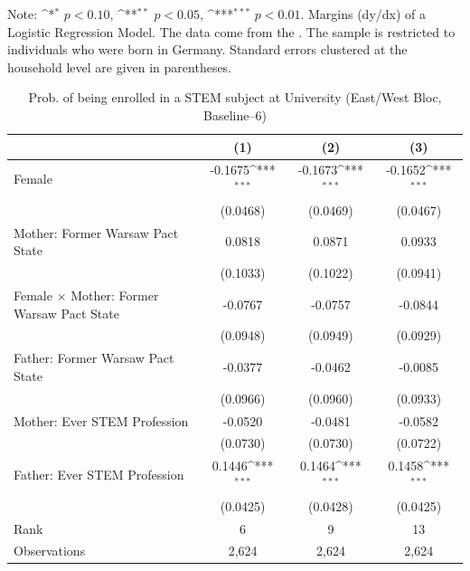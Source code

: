 \documentclass[a4paper, oneside, hyperfootnotes = false]{article}
\def\sym#1{\ifmmode^{#1}\else\(^{#1}\)\fi}
\begin{document}
{\begin{table}[ht]
\begin{center}
		\parbox{10cm}{
			\linespread{1}\footnotesize Note: \sym{*} \(p<0.10\), \sym{**} \(p<0.05\), \sym{***} \(p<0.01\). Margins (dy/dx) of a Logistic Regression Model. The data come from the \cite{SOEP2023}. The sample is restricted to individuals who were born in Germany. Standard errors clustered at the household level are given in parentheses.}
		
	\end{center}
\end{table}

\begin{table}[ht]
	\caption[STEM subject at University (East/West Bloc, Baseline--6)]{Prob. of being enrolled in a STEM subject at University (East/West Bloc, Baseline--6)}
	\label{tab:extension}
	\begin{center}
		\begin{tabular}{l*{3}{c}}
			\toprule
			&\multicolumn{1}{c}{(1)}         &\multicolumn{1}{c}{(2)}         &\multicolumn{1}{c}{(3)}         \\
			\midrule
			Female              &     -0.1675\sym{***}&     -0.1673\sym{***}&     -0.1652\sym{***}\\
			&    (0.0468)         &    (0.0469)         &    (0.0467)         \\
			\addlinespace
			Mother: Former Warsaw Pact State&      0.0818         &      0.0871         &      0.0933         \\
			&    (0.1033)         &    (0.1022)         &    (0.0941)         \\
			\addlinespace
			Female $\times$ Mother: Former Warsaw Pact State&     -0.0767         &     -0.0757         &     -0.0844         \\
			&    (0.0948)         &    (0.0949)         &    (0.0929)         \\
			\addlinespace
			Father: Former Warsaw Pact State&     -0.0377         &     -0.0462         &     -0.0085         \\
			&    (0.0966)         &    (0.0960)         &    (0.0933)         \\
			\addlinespace
			Mother: Ever STEM Profession&     -0.0520         &     -0.0481         &     -0.0582         \\
			&    (0.0730)         &    (0.0730)         &    (0.0722)         \\
			\addlinespace
			Father: Ever STEM Profession&      0.1446\sym{***}&      0.1464\sym{***}&      0.1458\sym{***}\\
			&    (0.0425)         &    (0.0428)         &    (0.0425)         \\
			\midrule
			Rank                &      6         &      9         &     13         \\
			Observations                  &   2,624         &   2,624         &   2,624         \\
			\bottomrule
		\end{tabular}
		

\end{center}
\end{table}}
\end{document}
